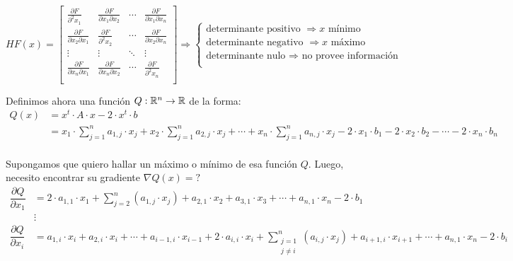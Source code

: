 \documentclass[]{article}
\begin{document}
\begin{center}
	$H F(x) = \begin{bmatrix}
		\frac{\partial F}{\partial^2 x_1} & \frac{\partial F}{\partial x_1 \partial x_2} & \cdots & \frac{\partial F}{\partial x_1 \partial x_n}\\[8pt]
		\frac{\partial F}{\partial x_2 \partial x_1} & \frac{\partial F}{\partial^2 x_2} & \cdots & \frac{\partial F}{\partial x_2 \partial x_n}\\
		\vdots & \vdots & \ddots & \vdots \\
		\frac{\partial F}{\partial x_n \partial x_1} & \frac{\partial F}{\partial x_n \partial x_2} & \cdots & \frac{\partial F}{\partial^2 x_n}\\
	\end{bmatrix} \Rightarrow \begin{cases}
		\text{determinante positivo $\Rightarrow x$ mínimo}\\
		\text{determinante negativo $\Rightarrow x$ máximo}\\
		\text{determinante nulo $\Rightarrow$ no provee información}\\
	\end{cases}$
\end{center}

Definimos ahora una función $Q:\mathbb{R}^n\to\mathbb{R}$ de la forma:
\begin{align*}
	Q(x) &= x^t\cdot A \cdot x - 2\cdot x^t \cdot b\\
	&= x_1 \cdot \sum_{j=1}^{n} a_{1,j}\cdot x_j + x_2 \cdot \sum_{j=1}^{n} a_{2,j}\cdot x_j + \cdots + x_n \cdot \sum_{j=1}^{n} a_{n,j}\cdot x_j - 2\cdot x_1\cdot b_1 - 2\cdot x_2\cdot b_2 - \cdots - 2\cdot x_n\cdot b_n\\
\end{align*}

Supongamos que quiero hallar un máximo o mínimo de esa función $Q$. Luego, necesito encontrar su gradiente $\nabla Q (x) = ?$
\begin{align*}
	\dfrac{\partial Q}{\partial x_1} &= 2\cdot a_{1,1}\cdot x_1 + \sum_{j=2}^n (a_{1,j}\cdot x_j) + a_{2,1}\cdot x_2 + a_{3,1}\cdot x_3 + \cdots + a_{n,1}\cdot x_n - 2\cdot b_1\\
	&\vdots \\
	\dfrac{\partial Q}{\partial x_i} &= a_{1,i}\cdot x_i + a_{2,i}\cdot x_i + \cdots + a_{i-1,i}\cdot x_{i-1} + 2\cdot a_{i,i}\cdot x_i + \sum_{\substack{j=1 \\ j\neq i}}^n (a_{i,j}\cdot x_j) + a_{i+1,i}\cdot x_{i+1} + \cdots + a_{n,1}\cdot x_n - 2\cdot b_i\\
\end{align*}
\end{document}
